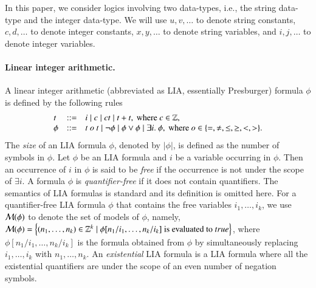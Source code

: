 
\smallskip

In this paper, we consider logics involving two data-types, i.e., the string data-type and the integer data-type. We will use $u, v, \dots$ to denote string constants,  $c, d,\dots$ to denote integer constants, $x, y, \dots$ to denote string variables, and $i, j, \dots$ to denote  integer variables.


\paragraph*{Linear integer arithmetic.}  A linear integer arithmetic (abbreviated as LIA, essentially Presburger) formula $\phi$ is defined by the following rules
\[
\begin{array}{l c l}
t & ::=  & i \mid c \mid ct \mid t + t, \mbox{ where } c \in \mathbb{Z}, \\
\phi &::= & t \ o \ t \mid \neg \phi \mid \phi \vee \phi \mid \exists i.\ \phi, \mbox{ where } o \in \{=, \neq, \le, \ge, <, >\}.
\end{array}
\]
The \emph{size} of an LIA formula $\phi$, denoted by $|\phi|$, is defined as the number of symbols in $\phi$.
Let $\phi$ be an LIA formula and $i$ be a variable occurring in $\phi$. Then an occurrence of $i$ in $\phi$ is said to be \emph{free}  if the occurrence is not under the scope of $\exists i$. A formula $\phi$ is \emph{quantifier-free} if it does not contain quantifiers. The semantics of LIA formulas is standard and its definition is omitted here.
For a quantifier-free LIA formula $\phi$ that contains the free variables $i_1, \ldots, i_k$, we use $\mathcal{M}(\phi)$ to denote the set of models of $\phi$, namely, $\mathcal{M}(\phi) = \left\{(n_1, \ldots , n_k) \in \mathbb{Z}^k \mid \phi[n_1/i_1, \ldots, n_k/i_k] \mbox{ is evaluated to } true\right\}$, where $\phi[n_1/i_1, \ldots, n_k/i_k]$ is the formula obtained from $\phi$ by simultaneously replacing $i_1,\ldots, i_k$ with $n_1,\ldots, n_k$. An \emph{existential} LIA formula is a LIA formula where all the existential quantifiers are under the scope of an even number of negation symbols.
